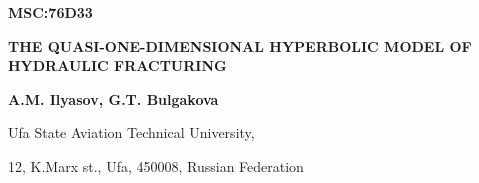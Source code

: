 


 

%

 

 

\renewcommand{\firstpage}{99}

\renewcommand{\lastpage}{106}

 \newcommand{\bigcom}{\text{\usefont{T2A}{cmfib}{m}{n}\large{\raisebox{1pt}{,}}}} %












\begin{flushleft}


\textbf{MSC:76D33}


\end{flushleft}



\begin{center}


\textbf{THE QUASI-ONE-DIMENSIONAL HYPERBOLIC MODEL OF HYDRAULIC FRACTURING}


\end{center}



\begin{center}


\textbf{A.M. Ilyasov, G.T. Bulgakova}


\end{center}

\begin{flushleft}


Ufa State Aviation Technical University,



12, K.Marx st., Ufa, 450008, Russian Federation


\end{flushleft}





